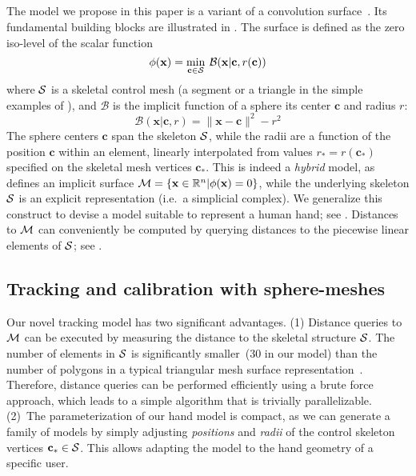 \subsection*{}
The model we propose in this paper is a variant of a convolution surface~\cite{bloomenthal1991convolution}. Its fundamental building blocks are illustrated in . The surface is defined as the zero iso-level of the scalar function
% 
\begin{equation}
\phi(\mathbf{x}) = \min_{\mathbf{c} \in \mathcal{S}} \: \mathcal{B}(\mathbf{x} | \mathbf{c}, r(\mathbf{c}))
\label{eq:convsurf}
\end{equation}
% 
where $\mathcal{S}$ is a skeletal control mesh (a segment or a triangle in the simple examples of ), and $\mathcal{B}$ is the implicit function of a sphere  its center $\mathbf{c}$ and radius $r$:
% 
\begin{equation}
\mathcal{B}(\mathbf{x} | \mathbf{c},r ) = \|\mathbf{x}-\mathbf{c}\|^2 - r^2
\end{equation}
% 
The sphere centers $\mathbf{c}$ span the skeleton $\mathcal{S}$, while the radii are a function of the position $\mathbf{c}$ within an element, linearly interpolated from values $r_*=r(\mathbf{c}_*)$ specified on the skeletal mesh vertices $\mathbf{c}_*$. This is indeed a \emph{hybrid} model, as  defines an implicit surface $\mathcal{M} = \{\mathbf{x} \in \mathbb{R}^n | \phi(\mathbf{x})=0 \}$, while the underlying skeleton $\mathcal{S}$ is an explicit representation (i.e.\ a simplicial complex). We generalize this construct to devise a model suitable to represent a human hand; see .
Distances to $\mathcal{M}$ can conveniently be computed by querying distances to the piecewise linear elements of $\mathcal{S}$; see .


\subsection*{Tracking and calibration with sphere-meshes}
Our novel tracking model has two significant advantages. (1) Distance queries to $\mathcal{M}$ can be executed by measuring the distance to the skeletal structure $\mathcal{S}$. The number of elements in $\mathcal{S}$ is significantly smaller~(30 in our model) than the number of polygons in a typical triangular mesh surface representation~\cite{thiery2013sphere}. 
Therefore, distance queries can be performed efficiently using a brute force approach, which leads to a simple algorithm that is trivially parallelizable.
(2)~The parameterization of our hand model is compact, as we can generate a family of models by simply adjusting \emph{positions} and \emph{radii} of the control skeleton vertices $\mathbf{c}_* \in \mathcal{S}$. This allows adapting the model to the hand geometry of a specific user.

